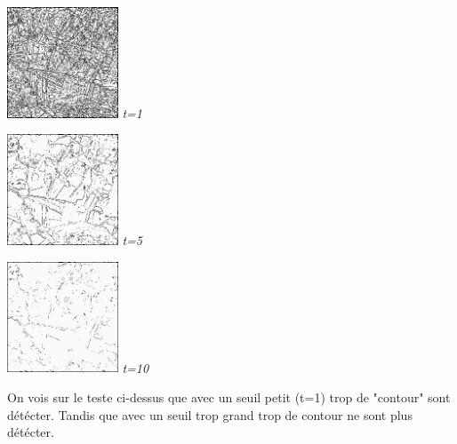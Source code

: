 \documentclass[a4,12pt]{article}
\begin{document}
\noindent
\begin{center}
\begin{minipage}[c]{0.20\linewidth}
	\begin{center}
		\includegraphics[width = 33mm]{./img/p2test_grad_fin_aqitain_t1.jpg}
		\textit{t=1}
	\end{center}
\end{minipage}
\begin{minipage}[c]{0.20\linewidth}
	\begin{center}
		\includegraphics[width = 33mm]{./img/p2test_grad_fin_aqitain_t5.jpg}
		\textit{t=5}
	\end{center}
\end{minipage}
\begin{minipage}[c]{0.20\linewidth}
	\begin{center}
		\includegraphics[width = 33mm]{./img/p2test_grad_fin_aqitain_t10.jpg}
		\textit{t=10}
	\end{center}
\end{minipage}
\end{center}

On vois sur le teste ci-dessus que avec un seuil petit (t=1) trop de "contour" sont détécter.
Tandis que avec un seuil trop grand trop de contour ne sont plus détécter.\\
\end{document}
